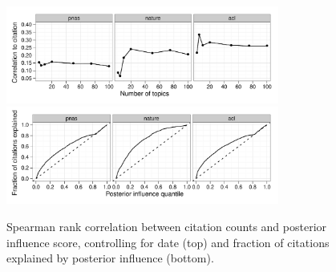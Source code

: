 


\begin{figure}[t]
  \centering
  \includegraphics[width=0.8\textwidth]{chapter_influence/figures/results_correlation.pdf} \\
  \includegraphics[width=0.8\textwidth]{chapter_influence/figures/results_roc.pdf} \\
  \caption{Spearman rank correlation between citation counts and
    posterior influence score, controlling for date (top) and fraction
    of citations explained by posterior influence (bottom).}
  \label{fig:results}
\end{figure}

